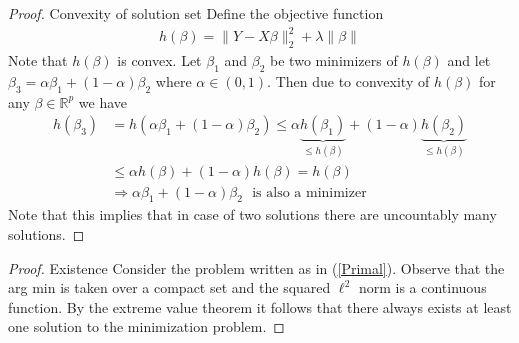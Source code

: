 \documentclass{article}
\theoremstyle{definition}
\begin{document}
\begin{proof} Convexity of solution set \newline
{}
Define the objective function
\begin{align*}
h(\beta)=\|Y-X\beta\|_2^2+\lambda\|\beta\|
\end{align*}
Note that $h(\beta)$ is convex. Let $\beta_1$ and $\beta_2$ be two minimizers of $h(\beta)$ and let $\beta_3=\alpha\beta_1+(1-\alpha)\beta_2$ where $\alpha \in (0,1)$. Then due to convexity of $h(\beta)$ for any $\beta \in \mathbb{R}^p$ we have
\begin{align*}
h(\beta_3)&=h(\alpha\beta_1+(1-\alpha)\beta_2) \leq \alpha \underbrace{h(\beta_1)}_{\leq h(\beta)}+(1-\alpha)\underbrace{h(\beta_2)}_{\leq h(\beta)} \\ &\leq \alpha h(\beta)+(1-\alpha)h(\beta)=h(\beta) \\ &\Rightarrow \alpha\beta_1+(1-\alpha)\beta_2 \ \ \ \text{is also a minimizer}
\end{align*}
Note that this implies that in case of two solutions there are uncountably many solutions.
\end{proof}

\begin{proof} Existence \newline
Consider the problem written as in (\ref{Primal}). Observe that the arg min is taken over a compact set and the squared $\ell^2$ norm is a continuous function. By the extreme value theorem it follows that there always exists at least one solution to the minimization problem.
\end{proof}
\end{document}
